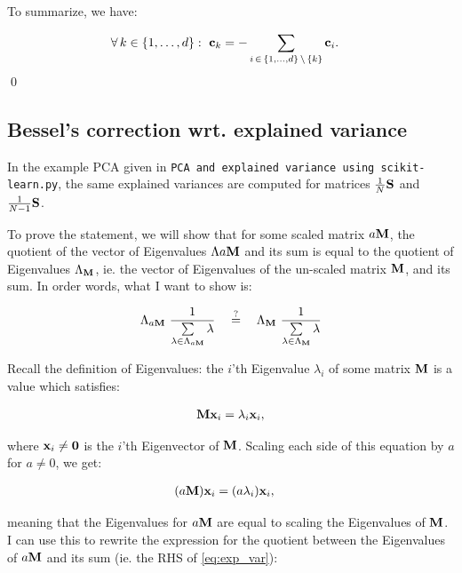 To summarize, we have:

\begin{align*}
\forall\, k \in \{1, \dots, d\} :\ \mathbf{c}_k &=  - \sum_{i\, \in\, \{1, \dots, d\}\,
           \setminus\, \{k\}} \mathbf{c}_i.
\end{align*}
\qed

\subsection{Bessel's correction wrt. explained variance}

In the example PCA given in \texttt{PCA and explained variance using scikit-}
\texttt{learn.py}, the same explained variances are computed for matrices
$\tfrac{1}{N}\mathbf{S}$ and $\tfrac{1}{N - 1}\mathbf{S}$.



To prove the statement, we will show that for some scaled matrix $a \mathbf{M}$, the
quotient of the vector of Eigenvalues $\Lambda{a \mathbf{M}}$ and its sum is equal
to the quotient of Eigenvalues $\Lambda_{\mathbf{M}}$, ie. the vector of Eigenvalues
of the un-scaled matrix $\mathbf{M}$, and its sum.
In order words, what I want to show is:

\begin{align}
  \Lambda_{a \mathbf{M}}\ \frac{1}{\sum\limits_{\lambda \in \Lambda_{a \mathbf{M}}}
  \lambda}\label{eq:exp_var}
  \quad \mathrel{\mathop{=}\limits^{?}} \quad
  \Lambda_{\mathbf{M}}\ \frac{1}{\sum\limits_{\lambda \in \Lambda_{\mathbf{M}}}
  \lambda}
\end{align}

Recall the definition of Eigenvalues: the $i$'th Eigenvalue $\lambda_i$ of some
matrix $\mathbf{M}$ is a value which satisfies:

\begin{align*}
  \mathbf{M} \mathbf{x}_i = \lambda_i \mathbf{x}_i,
\end{align*}

where $\mathbf{x}_i \neq \mathbf{0}$ is the $i$'th Eigenvector of $\mathbf{M}$. Scaling each
side of this equation by $a$ for $a \neq 0$, we get:

\begin{align*}
(a\mathbf{M}) \mathbf{x}_i &= (a\lambda_i) \mathbf{x}_i,
\end{align*}

meaning that the Eigenvalues for $a \mathbf{M}$ are equal to scaling the Eigenvalues
of $\mathbf{M}$. I can use this to rewrite the expression for the quotient between
the Eigenvalues of $a \mathbf{M}$ and its sum (ie. the RHS of \cref{eq:exp_var}):

